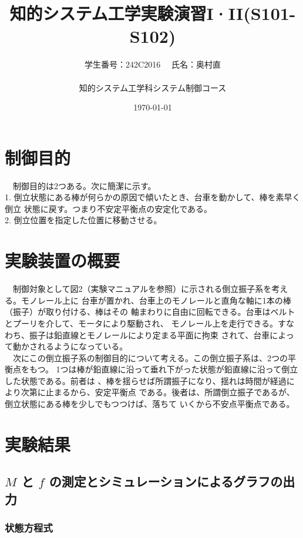 \documentclass[10pt,a4paper,titlepage]{jreport} %
\title{知的システム工学実験演習I·II(S101-S102)} %
\author{
  学生番号：242C2016 　氏名：奥村直 \\
  \\
  知的システム工学科システム制御コース
  } %
\date{\today} %
\begin{document}
\setcounter{secnumdepth}{3}
\maketitle

\chapter{制御目的}

　制御目的は2つある。次に簡潔に示す。 \\

1. 倒立状態にある棒が何らかの原因で傾いたとき、台車を動かして、棒を素早く倒立
  状態に戻す。つまり不安定平衡点の安定化である。\\

2. 倒立位置を指定した位置に移動させる。

\chapter{実験装置の概要}

　制御対象として図2（実験マニュアルを参照）に示される倒立振子系を考える。モノレール上に
台車が置かれ、台車上のモノレールと直角な軸に1本の棒（振子）が取り付ける、棒はその
軸まわりに自由に回転できる。台車はベルトとプーリを介して、モータにより駆動され、
モノレール上を走行できる。すなわち、振子は鉛直線とモノレールにより定まる平面に拘束
されて、台車によって動かされるようになっている。\\

　次にこの倒立振子系の制御目的について考える。この倒立振子系は、2つの平衡点をもつ。
1つは棒が鉛直線に沿って垂れ下がった状態が鉛直線に沿って倒立した状態である。前者は
、棒を揺らせば所謂振子になり、揺れは時間が経過により次第に止まるから、安定平衡点
である。後者は、所謂倒立振子であるが、倒立状態にある棒を少しでもつつけば、落ちて
いくから不安点平衡点である。

\chapter{実験結果}

\section{ $M$ と $f$ の測定とシミュレーションによるグラフの出力}

\subsection{状態方程式}
\end{document}
